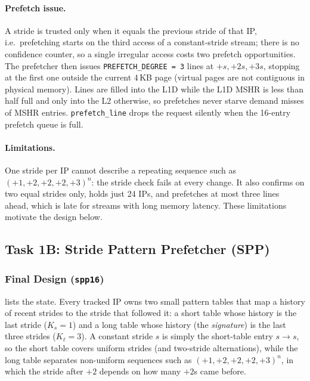 \documentclass[12pt, a4paper]{article}
\begin{document}
\paragraph{Prefetch issue.} A stride is trusted only when it equals the
previous stride of that IP, i.e.\ prefetching starts on the third access of a
constant-stride stream; there is no confidence counter, so a single irregular
access costs two prefetch opportunities. The prefetcher then issues
\texttt{PREFETCH\_DEGREE = 3} lines at $+s, +2s, +3s$, stopping at the first
one outside the current 4\,KB page (virtual pages are not contiguous in
physical memory). Lines are filled into the L1D while the L1D MSHR is less
than half full and only into the L2 otherwise, so prefetches never starve
demand misses of MSHR entries. \texttt{prefetch\_line} drops the request
silently when the 16-entry prefetch queue is full.

\paragraph{Limitations.} One stride per IP cannot describe a repeating
sequence such as $(+1,\allowbreak+2,\allowbreak+2,\allowbreak+2,\allowbreak+3)^n$: the stride check fails at every change.
It also confirms on two equal strides only, holds just 24 IPs, and prefetches
at most three lines ahead, which is late for streams with long memory latency.
These limitations motivate the design below.

\subsection{Task 1B: Stride Pattern Prefetcher (SPP)}\label{sec:task1b}

\subsubsection{Final Design (\texttt{spp16})}\label{sec:spp-design}
 lists the state. Every tracked IP owns two small pattern
tables that map a history of recent strides to the stride that followed
it: a short table whose history is the last stride ($K_s=1$) and a long table
whose history (the \emph{signature}) is the last three strides ($K_\ell=3$).
A constant stride $s$ is simply the short-table entry $s\to s$, so the short
table covers uniform strides (and two-stride alternations), while the long
table separates non-uniform sequences such as $(+1,+2,+2,+2,+3)^n$, in which
the stride after $+2$ depends on how many $+2$s came before.
\end{document}
